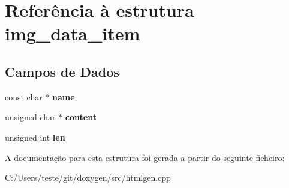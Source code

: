 \hypertarget{structimg__data__item}{\section{Referência à estrutura img\-\_\-data\-\_\-item}
\label{structimg__data__item}
}
\subsection*{Campos de Dados}
\begin{DoxyCompactItemize}
\item 
\hypertarget{structimg__data__item_a8f8f80d37794cde9472343e4487ba3eb}{const char $\ast$ {\bfseries name}}\label{structimg__data__item_a8f8f80d37794cde9472343e4487ba3eb}

\item 
\hypertarget{structimg__data__item_a8cff7748b5b3118a34d99936238e78d8}{unsigned char $\ast$ {\bfseries content}}\label{structimg__data__item_a8cff7748b5b3118a34d99936238e78d8}

\item 
\hypertarget{structimg__data__item_a77124bd5f7e31e6fffc19f335da0c23f}{unsigned int {\bfseries len}}\label{structimg__data__item_a77124bd5f7e31e6fffc19f335da0c23f}

\end{DoxyCompactItemize}


A documentação para esta estrutura foi gerada a partir do seguinte ficheiro\-:\begin{DoxyCompactItemize}
\item 
C\-:/\-Users/teste/git/doxygen/src/htmlgen.\-cpp\end{DoxyCompactItemize}
